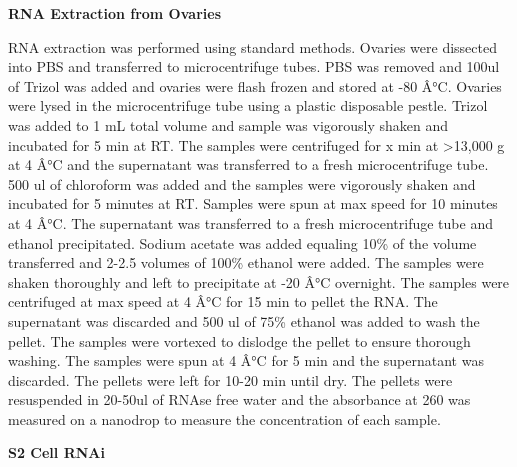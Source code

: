 \documentclass[12pt,oneside]{reedthesis}
\begin{document}
\textbf{RNA Extraction from Ovaries}

RNA extraction was performed using standard methods. Ovaries were
dissected into PBS and transferred to microcentrifuge tubes. PBS was
removed and 100ul of Trizol was added and ovaries were flash frozen and
stored at -80 Â°C. Ovaries were lysed in the microcentrifuge tube using a
plastic disposable pestle. Trizol was added to 1 mL total volume and
sample was vigorously shaken and incubated for 5 min at RT. The samples
were centrifuged for x min at \textgreater13,000 g at 4 Â°C and the supernatant was
transferred to a fresh microcentrifuge tube. 500 ul of chloroform was
added and the samples were vigorously shaken and incubated for 5 minutes
at RT. Samples were spun at max speed for 10 minutes at 4 Â°C. The
supernatant was transferred to a fresh microcentrifuge tube and ethanol
precipitated. Sodium acetate was added equaling 10\% of the volume
transferred and 2-2.5 volumes of 100\% ethanol were added. The samples
were shaken thoroughly and left to precipitate at -20 Â°C overnight. The
samples were centrifuged at max speed at 4 Â°C for 15 min to pellet the
RNA. The supernatant was discarded and 500 ul of 75\% ethanol was added
to wash the pellet. The samples were vortexed to dislodge the pellet to
ensure thorough washing. The samples were spun at 4 Â°C for 5 min and the
supernatant was discarded. The pellets were left for 10-20 min until
dry. The pellets were resuspended in 20-50ul of RNAse free water and the
absorbance at 260 was measured on a nanodrop to measure the
concentration of each sample.

\textbf{S2 Cell RNAi}
\end{document}
